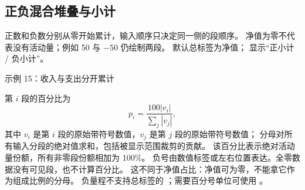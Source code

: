 \subsection{正负混合堆叠与小计}
正数和负数分别从零开始累计，输入顺序只决定同一侧的段顺序。
净值为零不代表没有活动量；例如 50 与 $-50$ 仍绘制两段。
默认总标签为净值； 显示“正小计 / 负小计”。
\begin{example}[text and listing,sidebyside=false]{示例 15：收入与支出分开累计}
\end{example}
第 $i$ 段的百分比为
\[
  p_i=\frac{100|v_i|}{\sum_j|v_j|},
\]
其中 $v_i$ 是第 $i$ 段的原始带符号数值，$v_j$ 是第 $j$ 段的原始带符号数值；
分母对所有输入分段的绝对值求和，包括被显示范围裁剪的贡献。
该百分比表示绝对活动量份额，所有非零段份额相加为 100\%。
负号由数值标签或左右位置表达。全零数据没有可见段，也不计算百分比。
这不同于净值占比：净值可为零，不能拿它作为组成比例的分母。
负量程不支持总标签的 ；需要百分号单位可使用 。
